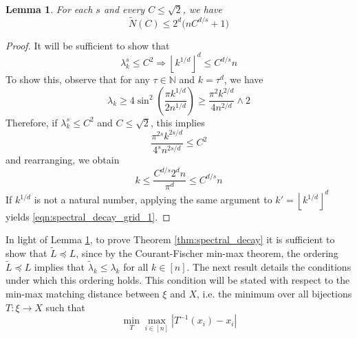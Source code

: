 \documentclass{article}
\newcommand{\abs}[1]{\left \lvert #1 \right \rvert}
\newcommand{\floor}[1]{\left\lfloor #1 \right\rfloor}
\newcommand{\1}{\mathbf{1}}
\newcommand{\wt}[1]{\widetilde{#1}}
\theoremstyle{alden}
\theoremstyle{aldenthm}
\newtheorem{lemma}{Lemma}
\theoremstyle{definition}
\theoremstyle{remark}
\begin{document}
\begin{lemma}
	\label{lem:spectral_decay_grid}
	For each $s$ and every $C \leq \sqrt{2}$, we have
	\begin{equation}
	\label{eqn:spectral_decay_grid}
	\wt{N}(C) \leq 2^d\big(n C^{d/s} + 1)
	\end{equation}
\end{lemma}
\begin{proof}
	It will be sufficient to show that 
	\begin{equation}
	\label{eqn:spectral_decay_grid_1}
	\lambda_k^s \leq C^2 \Rightarrow \floor{k^{1/d}}^d \leq C^{d/s}n
	\end{equation}
	To show this, observe that for any $\tau \in \mathbb{N}$ and $k = \tau^d$, we have
	\begin{equation*}
	\lambda_k \geq 4 \sin^2 \left(\frac{\pi k^{1/d}}{2n^{1/d}}\right) \geq \frac{\pi^2 k^{2/d}}{4 n^{2/d}} \wedge 2
	\end{equation*}
	Therefore, if $\lambda_k^s \leq C^2$ and $C \leq \sqrt{2}$, this implies
	\begin{equation*}
	\frac{\pi^{2s} k^{2s/d}}{4^s n^{2s/d}} \leq C^{2}
	\end{equation*}
	and rearranging, we obtain
	\begin{equation*}
	k \leq \frac{C^{d/s} 2^d n}{\pi^d} \leq C^{d/s}n
	\end{equation*}	
	If $k^{1/d}$ is not a natural number, applying the same argument to $k' = \floor{k^{1/d}}^d$ yields \eqref{eqn:spectral_decay_grid_1}.
\end{proof}

In light of Lemma \ref{lem:spectral_decay_grid}, to prove Theorem \ref{thm:spectral_decay} it is sufficient to show that $\wt{L} \preceq L$, since by the Courant-Fischer min-max theorem, the ordering $\wt{L} \preceq L$ implies that $\wt{\lambda}_k \leq \lambda_k$ for all $k \in [n]$. The next result details the conditions under which this ordering holds. This condition will be stated with respect to the min-max matching distance between $\xi$ and $X$, i.e. the minimum over all bijections $T: \xi \to X$ such that
\begin{equation*}
\min_{T} \max_{i \in [n]} \abs{T^{-1}(x_i) - x_i} 
\end{equation*}
\end{document}
